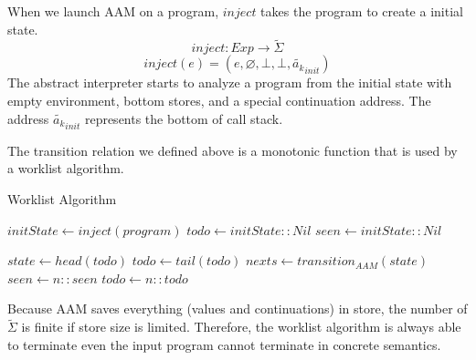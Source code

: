 \documentclass{article}
\begin{document}
When we launch AAM on a program, $inject$ takes the program to create a initial state.
\[
inject : Exp \to \tilde{\Sigma}
\]
\[
inject(e) = (e, \varnothing, \bot, \bot, \tilde{a_k}_{init})
\]
The abstract interpreter starts to analyze a program from the initial state with empty environment, bottom stores, and a special continuation address.
The address $\tilde{a_k}_{init}$ represents the bottom of call stack.

The transition relation we defined above is a monotonic function that is used by a worklist algorithm.
\begin{algorithm}
\caption{Worklist Algorithm}\label{euclid}
\begin{algorithmic}[1]
\State $\textit{initState} \gets inject(program)$
\State $\textit{todo} \gets \textit{initState} :: Nil$
\State $\textit{seen} \gets \textit{initState} :: Nil$

  \State $\textit{state} \gets head(\textit{todo})$
  \State $\textit{todo} \gets tail(\textit{todo})$
  \State $\textit{nexts} \gets transition_{AAM}(\textit{state})$
      \State $\textit{seen} \gets \textit{n} :: \textit{seen}$
      \State $\textit{todo} \gets \textit{n} :: \textit{todo}$
    \EndIf
  \EndFor
\EndWhile
\end{algorithmic}
\end{algorithm}
Because AAM saves everything (values and continuations) in store, the number of $\tilde{\Sigma}$ is finite if store size is limited.
Therefore, the worklist algorithm is always able to terminate even the input program cannot terminate in concrete semantics.
\end{document}
